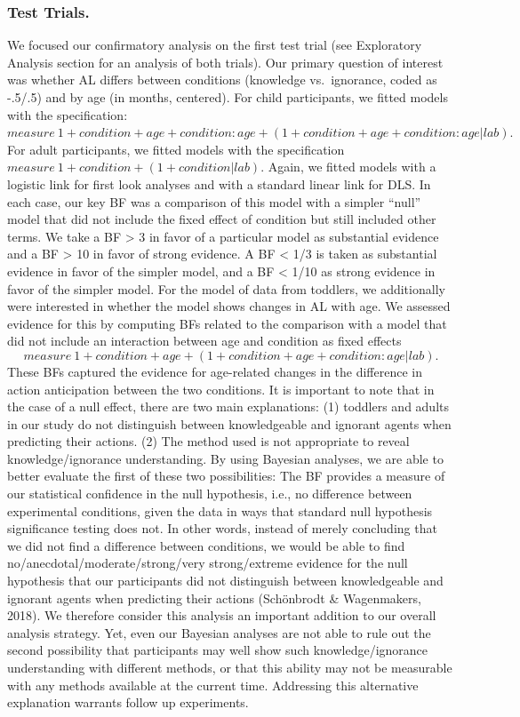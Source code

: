 \documentclass[
  english,
  man,floatsintext]{apa6}
\begin{document}
\hypertarget{test-trials.}{%
\subsubsection{Test Trials.}\label{test-trials.}}

We focused our confirmatory analysis on the first test trial (see Exploratory Analysis section for an analysis of both trials). Our primary question of interest was whether AL differs between conditions (knowledge vs.~ignorance, coded as -.5/.5) and by age (in months, centered). For child participants, we fitted models with the specification:
\(measure ~ 1 + condition + age + condition:age + (1 + condition + age + condition:age | lab).\)
For adult participants, we fitted models with the specification
\(measure ~ 1 + condition + (1 + condition | lab).\)
Again, we fitted models with a logistic link for first look analyses and with a standard linear link for DLS.
In each case, our key BF was a comparison of this model with a simpler ``null'' model that did not include the fixed effect of condition but still included other terms. We take a BF \textgreater{} 3 in favor of a particular model as substantial evidence and a BF \textgreater{} 10 in favor of strong evidence. A BF \textless{} 1/3 is taken as substantial evidence in favor of the simpler model, and a BF \textless{} 1/10 as strong evidence in favor of the simpler model.
For the model of data from toddlers, we additionally were interested in whether the model shows changes in AL with age. We assessed evidence for this by computing BFs related to the comparison with a model that did not include an interaction between age and condition as fixed effects
\[measure ~ 1 + condition + age + (1 + condition + age + condition:age | lab).\]
These BFs captured the evidence for age-related changes in the difference in action anticipation between the two conditions.
It is important to note that in the case of a null effect, there are two main explanations: (1) toddlers and adults in our study do not distinguish between knowledgeable and ignorant agents when predicting their actions. (2) The method used is not appropriate to reveal knowledge/ignorance understanding. By using Bayesian analyses, we are able to better evaluate the first of these two possibilities: The BF provides a measure of our statistical confidence in the null hypothesis, i.e., no difference between experimental conditions, given the data in ways that standard null hypothesis significance testing does not. In other words, instead of merely concluding that we did not find a difference between conditions, we would be able to find no/anecdotal/moderate/strong/very strong/extreme evidence for the null hypothesis that our participants did not distinguish between knowledgeable and ignorant agents when predicting their actions (Schönbrodt \& Wagenmakers, 2018). We therefore consider this analysis an important addition to our overall analysis strategy. Yet, even our Bayesian analyses are not able to rule out the second possibility that participants may well show such knowledge/ignorance understanding with different methods, or that this ability may not be measurable with any methods available at the current time. Addressing this alternative explanation warrants follow up experiments.
\end{document}
